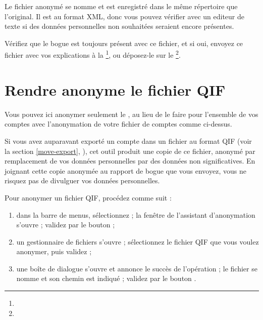 Le fichier anonymé se nomme  et est enregistré dans le même répertoire que l'original. Il est au format XML, donc vous pouvez vérifier avec un \gls{editeur de texte} si des données personnelles non souhaitées seraient encore présentes.

Vérifiez que le bogue est toujours présent avec ce fichier, et si oui,
envoyez ce fichier avec vos explications à la \footnote{\urlListBugsreport{}}, ou déposez-le sur le
\footnote{\urlBugTracker{}}.

 
\section{Rendre anonyme le fichier QIF\label{maintenance-QIF-anonymous}}


Vous pouvez ici anonymer seulement le , au lieu de le faire pour l'ensemble de vos comptes avec l'anonymation de votre fichier de comptes comme ci-dessus.

Si vous avez auparavant exporté un compte dans un fichier au format QIF (voir la section \vref{move-export}, ), cet outil produit une copie de ce fichier, anonymé par remplacement de vos données personnelles par des données non significatives. En joignant cette copie anonymée au rapport de bogue que vous envoyez, vous ne risquez pas de divulguer vos données personnelles.

Pour anonymer un fichier QIF, procédez comme suit :

\begin{enumerate}
	\item dans la barre de menus, sélectionnez  ; la fenêtre de l'assistant d'anonymation s'ouvre ; validez par le bouton  ;
	\item un gestionnaire de fichiers s'ouvre ; sélectionnez le fichier QIF que vous voulez anonymer, puis validez ;
	\item une boîte de dialogue s'ouvre et annonce le succès de l'opération ; le fichier se nomme  et son chemin est indiqué ; validez par le bouton .
\end{enumerate}

